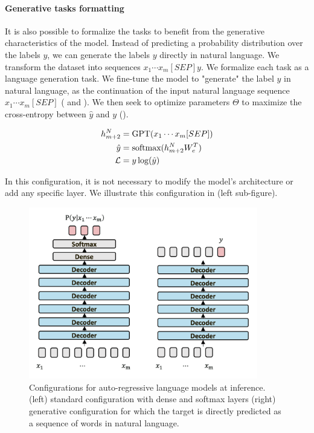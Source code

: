 {%
\paragraph{Generative tasks formatting} It is also possible to formalize the tasks to benefit from the generative characteristics of the model. Instead of predicting a probability distribution over the labels $y$, we can generate the labels $y$ directly in natural language. We transform the dataset into sequences $x_1 \cdots x_m [SEP] y$. We formalize each task as a language generation task. We fine-tune the model to "generate" the label $y$ in natural language, as the continuation of the input natural language sequence $x_1 \cdots x_m [SEP]$ ( and ). We then seek to optimize \gpt parameters $\Theta$ to maximize the cross-entropy between $\hat{y}$ and $y$ ().

\begin{align}
    h_{m+2}^N &= \textrm{GPT}(x_1 \cdots x_m [SEP]) \labeq{generative:gpt-lm} \\
    \hat{y} &= \textrm{softmax}(h_{m+2}^N W_e^T) \labeq{generative:token-proba-m+1} \\
    \mathcal{L} &= y \log(\hat{y}) \labeq{generative:cross-entropy}
\end{align}

In this configuration, it is not necessary to modify the model's architecture or add any specific layer. We illustrate this configuration in  (left sub-figure).
}

\begin{figure}[!htb]
\begin{center}
\includegraphics[width=10cm]{images/generative-2.png}
\end{center}
\caption{Configurations for auto-regressive language models at inference. (left) standard configuration with dense and softmax layers (right) generative configuration for which the target is directly predicted as a sequence of words in natural language.}
\end{figure}

